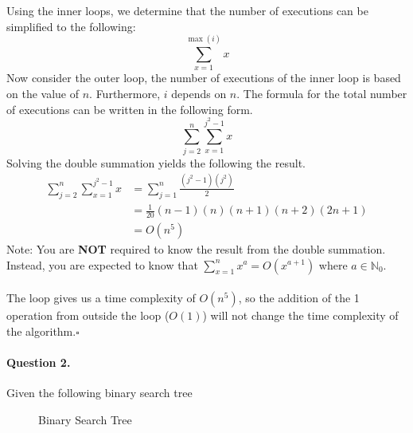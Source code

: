 \documentclass[12pt]{article}
\newcommand{\EOQ}{\hfill $\square$}
\begin{document}
Using the inner loops, we determine that the number of executions can be simplified to the following:
\begin{equation*}
\sum_{x=1}^{\max(i)}x
\end{equation*}
Now consider the outer loop, the number of executions of the inner loop is based on the value of $n$. Furthermore, $i$ depends on $n$. The formula for the total number of executions can be written in the following form.
\begin{equation*}
\sum_{j=2}^{n}\sum_{x=1}^{j^2-1}x
\end{equation*}
Solving the double summation yields the following the result.
\begin{equation*}
\begin{split}
\sum_{j=2}^{n}\sum_{x=1}^{j^2-1}x&=\sum_{j=1}^{n}\frac{(j^2-1)(j^2)}{2}\\&=\frac{1}{20}(n-1)(n)(n+1)(n+2)(2n+1)\\
&=O(n^5)
\end{split}
\end{equation*}
Note: You are \textbf{NOT} required to know the result from the double summation. Instead, you are expected to know that $\sum\limits_{x=1}^{n}x^a=O(x^{a+1})$ where $a\in\mathbb{N}_0$.\\\\The loop gives us a time complexity of $O(n^5)$, so the addition of the 1 operation from outside the loop ($O(1)$) will not change the time complexity of the algorithm.\EOQ
\paragraph{Question 2.} Given the following binary search tree

\begin{figure}[H]
		\centering
		\caption{Binary Search Tree}
		\label{fig:BST}
	\end{figure}
\end{document}
